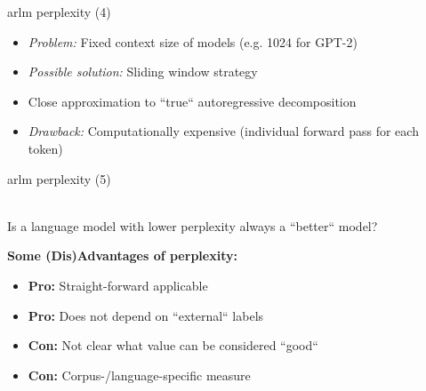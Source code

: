 \documentclass[11pt,compress,t,notes=noshow, xcolor=table]{beamer}
\begin{document}
\begin{frame}{arlm perplexity (4)}

\vfill

\begin{itemize}
	\item \textit{Problem:} Fixed context size of models (e.g. 1024 for GPT-2) 
\end{itemize}

\begin{figure}
    \centering
\end{figure}

\begin{itemize}
	\item \textit{Possible solution:} Sliding window strategy
	\item Close approximation to ``true`` autoregressive decomposition
	\item \textit{Drawback:} Computationally expensive (individual forward pass for each token)
\end{itemize}

\vfill

\end{frame}


\begin{frame}{arlm perplexity (5)}

\vfill

\ques\\ Is a language model with lower perplexity always a ``better`` model?

\vspace{.5cm}

\textbf{Some (Dis)Advantages of perplexity:}

\begin{itemize}
	\item \textbf{Pro:} Straight-forward applicable
	\item \textbf{Pro:} Does not depend on ``external`` labels
	\item \textbf{Con:} Not clear what value can be considered ``good``
	\item \textbf{Con:} Corpus-/language-specific measure
\end{itemize}

\vfill

\end{frame}
\end{document}
